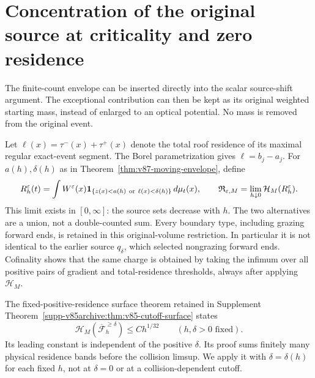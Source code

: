 \section{Concentration of the original source at criticality and zero residence}
\label{sec:v87-original}
The finite-count envelope can be inserted directly into the scalar
source-shift argument. The exceptional contribution can then be kept as
its original weighted starting mass, instead of enlarged to an optical
potential. No mass is removed from the original event.

Let $\ell(x)=\tau^-(x)+\tau^+(x)$ denote the total roof residence of
its maximal regular exact-event segment. The Borel parametrization gives
$\ell=b_j-a_j$. For $a(h),\delta(h)$ as in
Theorem~\ref{thm:v87-moving-envelope}, define
\begin{equation}\label{eq:v87-exceptional-source}
 R_h^\varepsilon(t)=\int W^\varepsilon(x)
   \one_{\{z(x)<a(h)\ \mathrm{or}\ \ell(x)<\delta(h)\}}\,d\mu_t(x),
 \qquad
 \mathfrak R_{\varepsilon,M}
     =\lim_{h\downarrow0}\mathcal H_M(R_h^\varepsilon).
\end{equation}
This limit exists in $[0,\infty]$: the source sets decrease with $h$.
The two alternatives are a union, not a double-counted sum.
Every boundary type, including grazing forward ends, is retained in
this original-volume restriction. In particular it is not identical
to the earlier source $q_\delta$, which selected nongrazing forward ends.
Cofinality shows that the same charge is obtained by taking the infimum
over all positive pairs of gradient and total-residence thresholds,
always after applying $\mathcal H_M$.

The fixed-positive-residence surface theorem retained in Supplement
Theorem~\ref{supp-v85archive:thm:v85-cutoff-surface} states
\begin{equation}\label{eq:v87-positive-residence-input}
 \mathcal H_M(\overline{\mathcal F}_h^{\ge\delta})
                          \le C h^{1/32}\qquad(h,\delta>0\text{ fixed}).
\end{equation}
Its leading constant is independent of the positive $\delta$. Its
proof sums finitely many physical residence bands before the collision
limsup. We apply it with $\delta=\delta(h)$ for each fixed $h$, not
at $\delta=0$ or at a collision-dependent cutoff.

